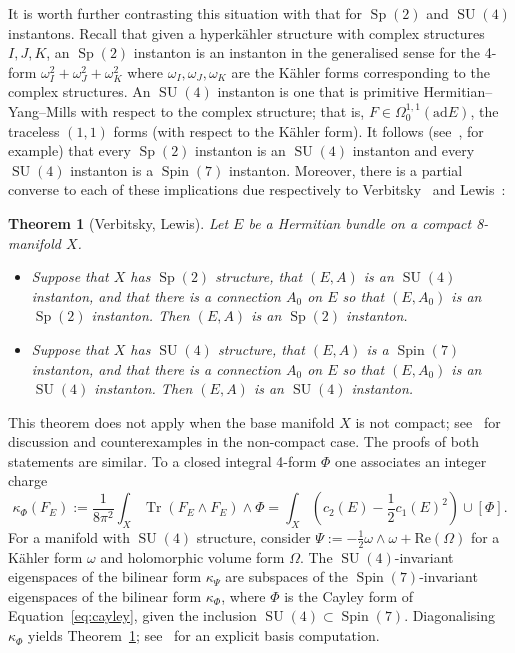 \documentclass{article}
\newcommand{\ad}{\mathrm{ad}}
\DeclareMathOperator\Spin{Spin}
\DeclareMathOperator\SU{SU}
\DeclareMathOperator\Sp{Sp}
\DeclareMathOperator{\Tr}{Tr}
\newtheorem{theorem}{Theorem}
\theoremstyle{definition}
\theoremstyle{remark}
\begin{document}
It is worth further contrasting this situation with that for $\Sp(2)$ and $\SU(4)$ instantons.
Recall that given a hyperk\"ahler structure with complex structures $I, J, K$, an $\Sp(2)$ instanton is an instanton in the generalised sense for the 4-form $\omega_I^2 + \omega_J^2 + \omega_K^2$ where $\omega_I, \omega_J, \omega_K$ are the K\"ahler forms corresponding to the complex structures.
An $\SU(4)$ instanton is one that is primitive Hermitian--Yang--Mills with respect to the complex structure; that is, $F \in \Omega^{1,1}_0(\ad E)$, the traceless $(1,1)$ forms (with respect to the K\"ahler form).
It follows (see~\cite{madnickSpnInstantonsFourierMukaiTransform2024}, for example) that every $\Sp(2)$ instanton is an $\SU(4)$ instanton and every $\SU(4)$ instanton is a $\Spin(7)$ instanton.
Moreover, there is a partial converse to each of these implications due respectively to Verbitsky~\cite{verbitskyHyperholomorphicBundlesHyperKahler1996} and Lewis~\cite{lewisSpin7Instantons}:
\begin{theorem}[Verbitsky, Lewis]
    \label{thm:verlew}
    Let $E$ be a Hermitian bundle on a compact 8-manifold $X$.
    \begin{itemize}
         \item Suppose that $X$ has $\Sp(2)$ structure, that $(E, A)$ is an $\SU(4)$ instanton, and that there is a connection $A_0$ on $E$ so that $(E, A_0)$ is an $\Sp(2)$ instanton.
             Then $(E, A)$ is an $\Sp(2)$ instanton.
        \item Suppose that $X$ has $\SU(4)$ structure, that $(E, A)$ is a $\Spin(7)$ instanton, and that there is a connection $A_0$ on $E$ so that $(E, A_0)$ is an $\SU(4)$ instanton.
             Then $(E, A)$ is an $\SU(4)$ instanton.
    \end{itemize}
\end{theorem}
This theorem does not apply when the base manifold $X$ is not compact; see~\cite{madnickSpnInstantonsFourierMukaiTransform2024} for discussion and counterexamples in the non-compact case.
The proofs of both statements are similar.
To a closed integral 4-form $\Phi$ one associates an integer charge
\begin{equation}
    \label{eq:instantonnumber}
    \kappa_\Phi(F_E) := \frac{1}{8\pi^2} \int_X \Tr(F_E \wedge F_E) \wedge \Phi = \int_X \left(c_2(E) - \frac12 c_1(E)^2\right) \cup [\Phi].
\end{equation}
For a manifold with $\SU(4)$ structure, consider $\Psi := -\frac{1}{2} \omega \wedge \omega + \mathrm{Re}(\Omega)$ for a K\"ahler form $\omega$ and holomorphic volume form $\Omega$.
The $\SU(4)$-invariant eigenspaces of the bilinear form $\kappa_\Psi$ are subspaces of the $\Spin(7)$-invariant eigenspaces of the bilinear form $\kappa_\Phi$, where $\Phi$ is the Cayley form of Equation~\eqref{eq:cayley}, given the inclusion $\SU(4) \subset \Spin(7)$.
Diagonalising $\kappa_\Phi$ yields Theorem~\ref{thm:verlew}; see~\cite[\S 3.2]{lewisSpin7Instantons} for an explicit basis computation.
\end{document}
